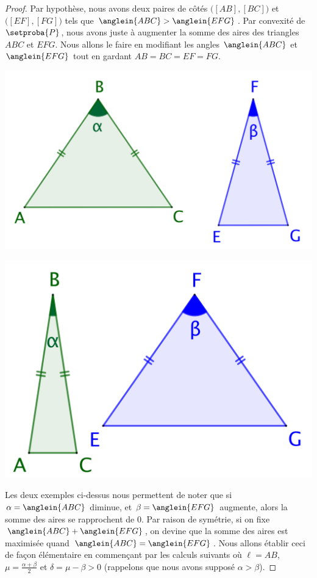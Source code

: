 \begin{proof}
	Par hypothèse, nous avons deux paires de côtés 
	$\big( [AB] , [BC] \big)$ et 
	$\big( [EF] , [FG] \big)$ tels que 
	$\anglein{ABC} > \anglein{EFG}$.
	Par convexité de $\setproba{P}$, nous avons juste à augmenter la somme des aires des triangles $ABC$ et $EFG$.
	Nous allons le faire en modifiant les angles $\anglein{ABC}$ et $\anglein{EFG}$ tout en gardant $AB = BC = EF = FG$.
	\begin{multicols}{2}
		\centering

		\includegraphics[scale=.4]{content/polygon/necessary-cond/2-eq-angles-1.png}

		\includegraphics[scale=.4]{content/polygon/necessary-cond/2-eq-angles-2.png}
	\end{multicols}

	Les deux exemples ci-dessus nous permettent de noter que si $\alpha = \anglein{ABC}$ diminue, et $\beta = \anglein{EFG}$ augmente, alors la somme des aires se rapprochent de $0$.
	Par raison de symétrie, si on fixe $\anglein{ABC} + \anglein{EFG}$, on devine que la somme des aires est maximisée quand $\anglein{ABC} = \anglein{EFG}$.
	Nous allons établir ceci de façon élémentaire en commençant par les calculs suivants où 
	$\ell = AB$, 
	$\mu = \frac{\alpha + \beta}{2}$ et 
	$\delta = \mu - \beta > 0$ (rappelons que nous avons supposé $\alpha > \beta$). 
	

\end{proof}
